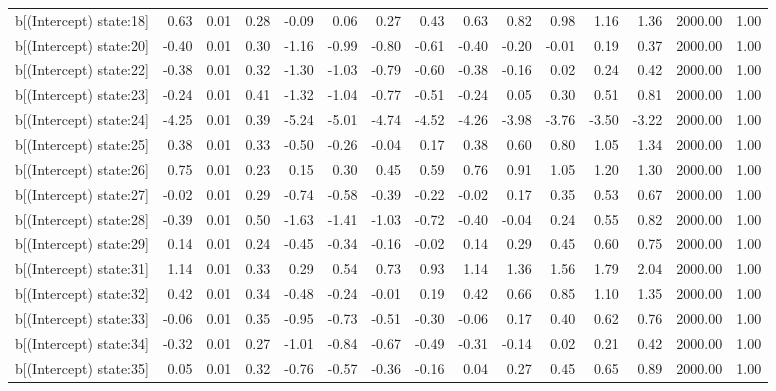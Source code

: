 \begin{table}[ht]
\begin{tabular}{rrrrrrrrrrrrrrr}
  b[(Intercept) state:18] & 0.63 & 0.01 & 0.28 & -0.09 & 0.06 & 0.27 & 0.43 & 0.63 & 0.82 & 0.98 & 1.16 & 1.36 & 2000.00 & 1.00 \\ 
  b[(Intercept) state:20] & -0.40 & 0.01 & 0.30 & -1.16 & -0.99 & -0.80 & -0.61 & -0.40 & -0.20 & -0.01 & 0.19 & 0.37 & 2000.00 & 1.00 \\ 
  b[(Intercept) state:22] & -0.38 & 0.01 & 0.32 & -1.30 & -1.03 & -0.79 & -0.60 & -0.38 & -0.16 & 0.02 & 0.24 & 0.42 & 2000.00 & 1.00 \\ 
  b[(Intercept) state:23] & -0.24 & 0.01 & 0.41 & -1.32 & -1.04 & -0.77 & -0.51 & -0.24 & 0.05 & 0.30 & 0.51 & 0.81 & 2000.00 & 1.00 \\ 
  b[(Intercept) state:24] & -4.25 & 0.01 & 0.39 & -5.24 & -5.01 & -4.74 & -4.52 & -4.26 & -3.98 & -3.76 & -3.50 & -3.22 & 2000.00 & 1.00 \\ 
  b[(Intercept) state:25] & 0.38 & 0.01 & 0.33 & -0.50 & -0.26 & -0.04 & 0.17 & 0.38 & 0.60 & 0.80 & 1.05 & 1.34 & 2000.00 & 1.00 \\ 
  b[(Intercept) state:26] & 0.75 & 0.01 & 0.23 & 0.15 & 0.30 & 0.45 & 0.59 & 0.76 & 0.91 & 1.05 & 1.20 & 1.30 & 2000.00 & 1.00 \\ 
  b[(Intercept) state:27] & -0.02 & 0.01 & 0.29 & -0.74 & -0.58 & -0.39 & -0.22 & -0.02 & 0.17 & 0.35 & 0.53 & 0.67 & 2000.00 & 1.00 \\ 
  b[(Intercept) state:28] & -0.39 & 0.01 & 0.50 & -1.63 & -1.41 & -1.03 & -0.72 & -0.40 & -0.04 & 0.24 & 0.55 & 0.82 & 2000.00 & 1.00 \\ 
  b[(Intercept) state:29] & 0.14 & 0.01 & 0.24 & -0.45 & -0.34 & -0.16 & -0.02 & 0.14 & 0.29 & 0.45 & 0.60 & 0.75 & 2000.00 & 1.00 \\ 
  b[(Intercept) state:31] & 1.14 & 0.01 & 0.33 & 0.29 & 0.54 & 0.73 & 0.93 & 1.14 & 1.36 & 1.56 & 1.79 & 2.04 & 2000.00 & 1.00 \\ 
  b[(Intercept) state:32] & 0.42 & 0.01 & 0.34 & -0.48 & -0.24 & -0.01 & 0.19 & 0.42 & 0.66 & 0.85 & 1.10 & 1.35 & 2000.00 & 1.00 \\ 
  b[(Intercept) state:33] & -0.06 & 0.01 & 0.35 & -0.95 & -0.73 & -0.51 & -0.30 & -0.06 & 0.17 & 0.40 & 0.62 & 0.76 & 2000.00 & 1.00 \\ 
  b[(Intercept) state:34] & -0.32 & 0.01 & 0.27 & -1.01 & -0.84 & -0.67 & -0.49 & -0.31 & -0.14 & 0.02 & 0.21 & 0.42 & 2000.00 & 1.00 \\ 
  b[(Intercept) state:35] & 0.05 & 0.01 & 0.32 & -0.76 & -0.57 & -0.36 & -0.16 & 0.04 & 0.27 & 0.45 & 0.65 & 0.89 & 2000.00 & 1.00 \\ 

\end{tabular}
\end{table}
